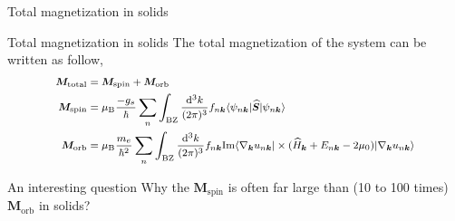 \documentclass{beamer}
\begin{document}
    \begin{frame}{Total magnetization in solids}
      \begin{block}{Total magnetization in solids}
        The total magnetization of the system can be written as follow,
        \begin{subequations}\footnotesize
          \begin{align}
            \bm{M}_{\text{total}} &= \bm{M}_{\text{spin}} + \bm{M}_{\text{orb}}\\
            \bm{M}_{\text{spin}} &= \mu_{\text{B}}\frac{-g_s}{\hbar}\sum_n\int_{\text{BZ}}\frac{\mathrm{d}^3k}{(2\pi)^3}f_{n\bm{k}}\langle\psi_{n\bm{k}}|\widehat{\bm{S}}|\psi_{n\bm{k}}\rangle\\
            \bm{M}_{\text{orb}} &= \mu_{\text{B}}\frac{m_e}{\hbar^2}\sum_n\int_{\text{BZ}}\frac{\mathrm{d}^3k}{(2\pi)^3}f_{n\bm{k}}\text{Im}\langle\nabla_{\bm{k}}u_{n\bm{k}}|\times(\widehat{H}_{\bm{k}}+E_{n\bm{k}}-2\mu_{0})|\nabla_{\bm{k}}u_{n\bm{k}}\rangle
          \end{align}
        \end{subequations}
      \end{block}
      \begin{alertblock}{An interesting question}
        Why the \(\bm{M}_{\text{spin}}\) is often far large than (10 to 100 times) \(\bm{M}_{\text{orb}}\) in solids?
      \end{alertblock}
    \end{frame}
\end{document}
